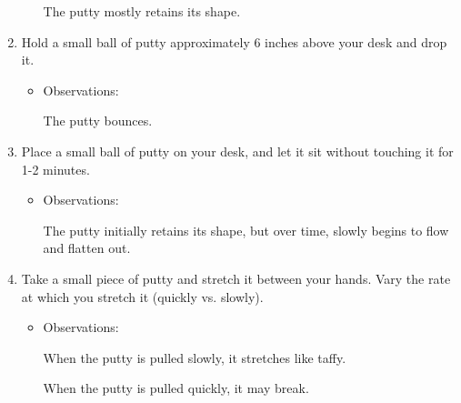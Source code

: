 \begin{activity}
\begin{model}
\begin{enumerate}
\begin{itemize}
				\begin{solution}[1in]
				
					The putty mostly retains its shape.
					
				\end{solution}
			\end{itemize}
			
		\item Hold a small ball of putty approximately 6 inches above your desk and drop it.
			\begin{itemize}
				\item Observations:
				
				\begin{solution}[1in]
				
					The putty bounces.
					
				\end{solution}
			\end{itemize}
		
		\item Place a small ball of putty on your desk, and let it sit without touching it for 1-2 minutes.
			\begin{itemize}
				\item Observations:
				
				\begin{solution}[1in]
				
					The putty initially retains its shape, but over time, slowly begins to flow and flatten out.
					
				\end{solution}
			\end{itemize}
		
		\item Take a small piece of putty and stretch it between your hands.  Vary the rate at which you stretch it (quickly vs. slowly).
			\begin{itemize}
				\item Observations:
				
				\begin{solution}[1.25in]
				
					When the putty is pulled slowly, it stretches like taffy.
					
					When the putty is pulled quickly, it may break.
					
				\end{solution}
			\end{itemize}
		
	\end{enumerate}


\end{model}
\end{activity}
